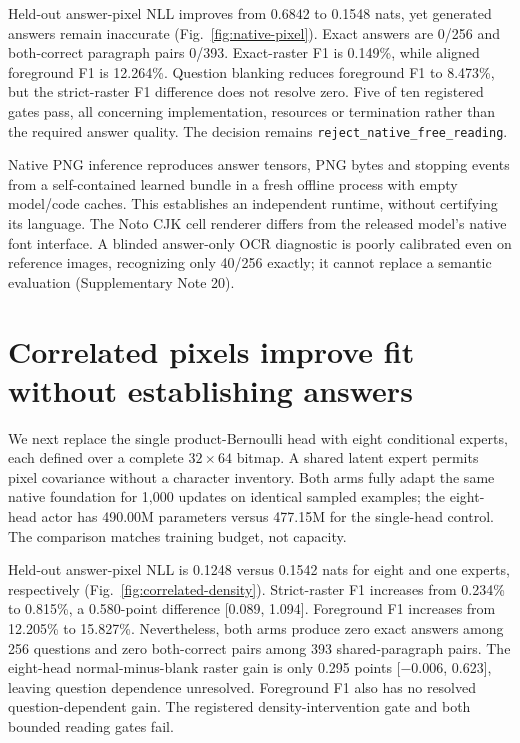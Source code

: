 Held-out answer-pixel NLL improves from 0.6842 to 0.1548 nats, yet generated
answers remain inaccurate (Fig.~\ref{fig:native-pixel}). Exact answers are
0/256 and both-correct paragraph pairs 0/393. Exact-raster F1 is 0.149\%,
while aligned foreground F1 is 12.264\%. Question blanking reduces foreground
F1 to 8.473\%, but the strict-raster F1 difference does not resolve zero.
Five of ten registered gates pass, all concerning implementation, resources
or termination rather than the required answer quality. The decision remains
\texttt{reject\_native\_free\_reading}.

Native PNG inference reproduces answer tensors, PNG bytes and stopping events
from a self-contained learned bundle in a fresh offline process with empty
model/code caches. This establishes an independent runtime, without certifying
its language. The Noto CJK cell renderer differs from the released model's
native font interface. A blinded answer-only OCR diagnostic is poorly
calibrated even on reference images, recognizing only 40/256 exactly; it
cannot replace a semantic evaluation (Supplementary Note 20).


\section*{Correlated pixels improve fit without establishing answers}
We next replace the single product-Bernoulli head with eight conditional
experts, each defined over a complete $32\times64$ bitmap. A shared latent
expert permits pixel covariance without a character inventory. Both arms
fully adapt the same native foundation for 1,000 updates on identical sampled
examples; the eight-head actor has 490.00M parameters versus 477.15M for the
single-head control. The comparison matches training budget, not capacity.

Held-out answer-pixel NLL is 0.1248 versus 0.1542 nats for eight and one
experts, respectively (Fig.~\ref{fig:correlated-density}). Strict-raster F1
increases from 0.234\% to 0.815\%, a 0.580-point difference [0.089, 1.094].
Foreground F1 increases from 12.205\% to 15.827\%. Nevertheless, both arms
produce zero exact answers among 256 questions and zero both-correct pairs
among 393 shared-paragraph pairs. The eight-head normal-minus-blank raster
gain is only 0.295 points [$-0.006$, 0.623], leaving question dependence
unresolved. Foreground F1 also has no resolved question-dependent gain.
The registered density-intervention gate and both bounded reading gates fail.

